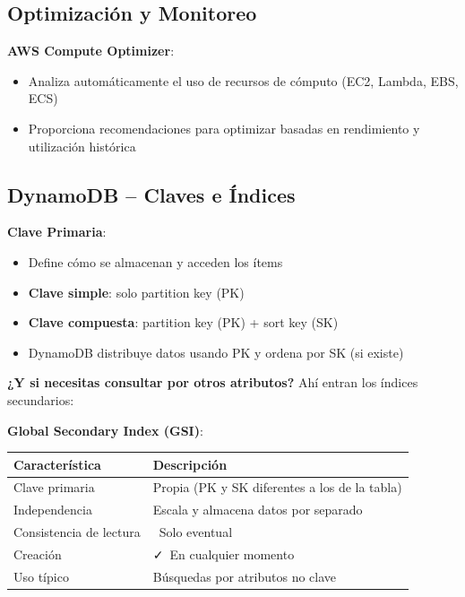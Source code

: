\documentclass[12pt,a4paper]{report}
\newcommand{\vcheckmark}{\textcolor{successgreen}{\faCheck}}
\newcommand{\crossmark}{\textcolor{dangerred}{\faTimes}}
\begin{document}
\subsection{Optimización y Monitoreo}

\textbf{AWS Compute Optimizer}:
\begin{itemize}
    \item Analiza automáticamente el uso de recursos de cómputo (EC2, Lambda, EBS, ECS)
    \item Proporciona recomendaciones para optimizar basadas en rendimiento y utilización histórica
\end{itemize}

\subsection{DynamoDB – Claves e Índices}

\textbf{Clave Primaria}:
\begin{itemize}
    \item Define cómo se almacenan y acceden los ítems
    \item \textbf{Clave simple}: solo partition key (PK)
    \item \textbf{Clave compuesta}: partition key (PK) + sort key (SK)
    \item DynamoDB distribuye datos usando PK y ordena por SK (si existe)
\end{itemize}

\textbf{¿Y si necesitas consultar por otros atributos?} Ahí entran los índices secundarios:

\textbf{Global Secondary Index (GSI)}:

\begin{center}
\begin{longtable}{|p{4cm}|p{9cm}|}
\hline
\cellcolor{successgreen!20}\textbf{Característica} & \cellcolor{successgreen!20}\textbf{Descripción} \\
\hline
Clave primaria & Propia (PK y SK diferentes a los de la tabla) \\
\hline
Independencia & Escala y almacena datos por separado \\
\hline
Consistencia de lectura & \crossmark\ Solo eventual \\
\hline
Creación & \vcheckmark\ En cualquier momento \\
\hline
Uso típico & Búsquedas por atributos no clave \\
\hline
\end{longtable}
\end{center}
\end{document}
